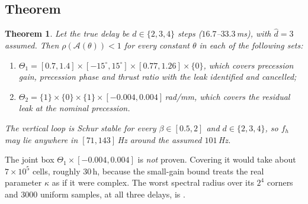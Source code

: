 \documentclass[11pt]{article}
\newtheorem{theorem}{Theorem}
\begin{document}
\subsection{Theorem}
\begin{theorem}\label{thm:main}
Let the true delay be $d\in\{2,3,4\}$ steps ($16.7$--$33.3$\,ms), with $\hat d=3$ assumed. Then
$\rho(\mathcal A(\theta))<1$ for every constant $\theta$ in each of the following sets:
\begin{enumerate}[label=(\alph*)]
\item $\Theta_1=[0.7,1.4]\times[-15^\circ,15^\circ]\times[0.77,1.26]\times\{0\}$, which covers
  precession gain, precession phase and thrust ratio with the leak identified and cancelled;
\item $\Theta_2=\{1\}\times\{0\}\times\{1\}\times[-0.004,0.004]$\,rad/mm, which covers the residual
  leak at the nominal precession.
\end{enumerate}
The vertical loop is Schur stable for every $\beta\in[0.5,2]$ and $d\in\{2,3,4\}$, so $f_h$ may lie
anywhere in $[71,143]$\,Hz around the assumed $101$\,Hz.
\end{theorem}
The joint box $\Theta_1\times[-0.004,0.004]$ is \emph{not} proven. Covering it would take about
$7\times10^5$ cells, roughly 30\,h, because the small-gain bound treats the real parameter $\kappa$ as
if it were complex. The worst spectral radius over its $2^4$ corners and 3000 uniform samples, at all
three delays, is \evidenceRadius.
\end{document}

